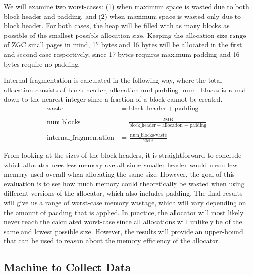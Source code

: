 We will examine two worst-cases: (1) when maximum space is wasted due to both block header and padding, and (2) when maximum space is wasted only due to block header. For both cases, the heap will be filled with as many blocks as possible of the smallest possible allocation size. Keeping the allocation size range of ZGC small pages in mind, 17 bytes and 16 bytes will be allocated in the first and second case respectively, since 17 bytes requires maximum padding and 16 bytes require no padding.

Internal fragmentation is calculated in the following way, where the total allocation consists of block header, allocation and padding. num\_blocks is round down to the nearest integer since a fraction of a block cannot be created.
\begin{align*}
    \text{waste} &= \text{block\_header} + \text{padding} \\\\
    \text{num\_blocks} &= \frac{2\text{MB}}{\text{block\_header + allocation + padding}} \\\\
    \text{internal\_fragmentation} &= \frac{\text{num\_blocks} \cdot \text{waste}}{2\text{MB}}
\end{align*}

From looking at the sizes of the block headers, it is straightforward to conclude which allocator uses less memory overall since smaller header would mean less memory used overall when allocating the same size. However, the goal of this evaluation is to see how much memory could theoretically be wasted when using different versions of the allocator, which also includes padding. The final results will give us a range of worst-case memory wastage, which will vary depending on the amount of padding that is applied. In practice, the allocator will most likely never reach the calculated worst-case since all allocations will unlikely be of the same and lowest possible size. However, the results will provide an upper-bound that can be used to reason about the memory efficiency of the allocator.



\subsection{Machine to Collect Data}


